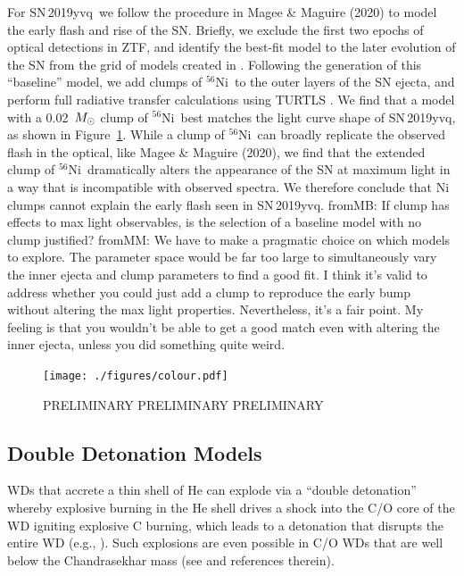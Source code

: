 \documentclass[twocolumn]{aastex63}
\newcommand{\frommark}[1]{{\color{orange} fromMM: {#1}}}
\newcommand{\frommb}[1]{{\color{purple} fromMB: {#1}}}
\newcommand{\radni}{$^{56}$Ni}
\newcommand{\sn}{SN\,2019yvq}
\begin{document}
For \sn\ we follow the procedure in Magee \& Maguire (2020) to model the
early flash and rise of the SN. Briefly, we exclude the first two epochs of
optical detections in ZTF, and identify the best-fit model to the later
evolution of the SN from the grid of models created in \citet{Magee20}.
Following the generation of this ``baseline'' model, we add clumps of \radni\
to the outer layers of the SN ejecta, and perform full radiative transfer
calculations using TURTLS \citep{Magee18}. We find that a model with
a 0.02~$M_{\rm{\odot}}$ clump of \radni\ best matches the light curve shape
of \sn, as shown in Figure~\ref{fig:Ni_bullet}. While a clump of \radni\ can
broadly replicate the observed flash in the optical, like Magee \& Maguire
(2020), we find that the extended clump of \radni\ dramatically alters the
appearance of the SN at maximum light in a way that is incompatible with
observed spectra. We therefore conclude that Ni clumps cannot explain the
early flash seen in \sn. \frommb{If clump has effects to max light observables, is the selection of a baseline model with no clump justified?}\frommark{We have to make a pragmatic choice on which models to explore. The parameter space would be far too large to simultaneously vary the inner ejecta and clump parameters to find a good fit. I think it's valid to address whether you could just add a clump to reproduce the early bump without altering the max light properties. Nevertheless, it's a fair point. My feeling is that you wouldn't be able to get a good match even with altering the inner ejecta, unless you did something quite weird.}

\begin{figure}
    \centering
    \texttt{[image: ./figures/colour.pdf]}
    \caption{PRELIMINARY PRELIMINARY PRELIMINARY}
    \label{fig:Ni_bullet}
\end{figure}

\subsection{Double Detonation Models}

WDs that accrete a thin shell of He can explode via a ``double detonation''
whereby explosive burning in the He shell drives a shock into the C/O core of
the WD igniting explosive C burning, which leads to a detonation that
disrupts the entire WD (e.g., \citealt{Nomoto82,Nomoto82a,Woosley94}). Such
explosions are even possible in C/O WDs that are well below the Chandrasekhar
mass (see \citealt{Fink07, Fink10} and references therein).
\end{document}
